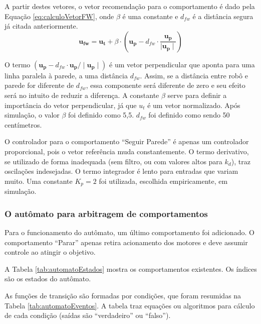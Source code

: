 		A partir destes vetores, o vetor recomendação para o comportamento é dado pela Equação
		\ref{eq:calculoVetorFW}, onde $\beta$ é uma constante e $d_{fw}$ é a distância segura já
		citada anteriormente. 
		\begin{equation}
			\label{eq:calculoVetorFW}
			\mathbf{u_{fw}} = \mathbf{u_t} + \beta \cdot \left(\mathbf{u_p} - d_{fw} \cdot 
			\frac{\mathbf{u_p}}{\mid \mathbf{u_p} \mid}\right)
		\end{equation}
		
		O termo $(\mathbf{u_p} - d_{fw} \cdot \mathbf{u_p}/\mid\mathbf{u_p}\mid)$ é um vetor 
		perpendicular que aponta para uma linha paralela à parede, a uma distância $d_{fw}$. 
		Assim, se a distância entre robô e parede for diferente de $d_{fw}$, essa componente será 
		diferente de zero e seu efeito será no intuito de reduzir a diferença. A constante $\beta$
		serve para definir a importância do vetor perpendicular, já que $u_t$ é um vetor
		normalizado. Após simulação, o valor $\beta$ foi definido como 5,5. $d_{fw}$ foi definido
		como sendo 50 centímetros.
		
		O controlador para o comportamento ``Seguir Parede'' é apenas um controlador proporcional,
		pois o vetor referência muda constantemente. O termo derivativo, se utilizado de forma 
		inadequada (sem filtro, ou com valores altos para $k_d$), traz oscilações indesejadas. O 
		termo integrador é lento para entradas que variam muito. Uma constante $K_p = 2$ foi 
		utilizada, escolhida empiricamente, em simulação.
		
		\subsubsection{O autômato para arbitragem de comportamentos}
	
		Para o funcionamento do autômato, um último comportamento foi adicionado. O comportamento 
		``Parar'' apenas retira acionamento dos motores e deve assumir controle ao atingir o 
		objetivo.
		
		A Tabela \ref{tab:automatoEstados} mostra os comportamentos existentes. Os índices são
		os estados do autômato. 
	
		
	
		As funções de transição são formadas por condições, que foram resumidas na Tabela 
		\ref{tab:automatoEventos}. A tabela traz equações ou algoritmos para cálculo de cada 
		condição (saídas são ``verdadeiro'' ou ``falso'').
		
